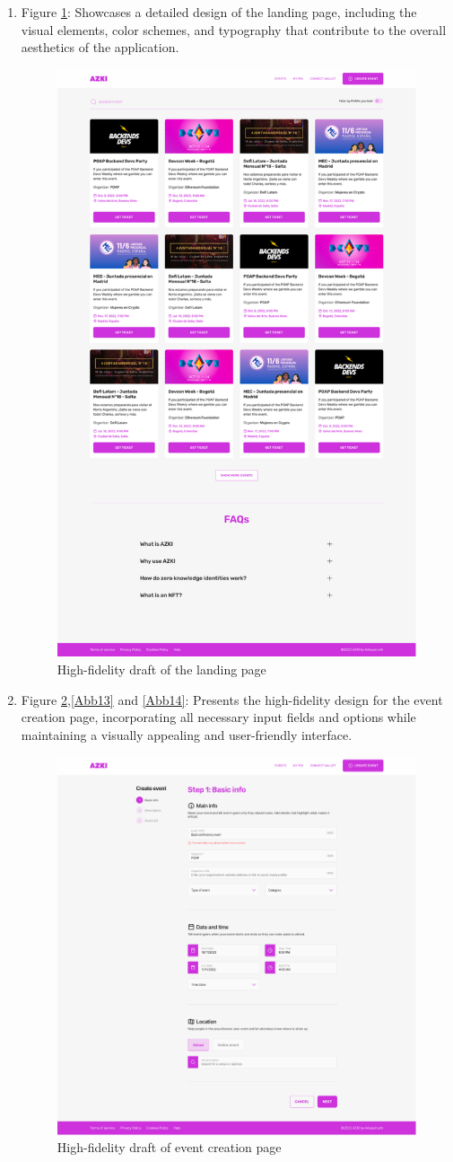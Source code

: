 \begin{enumerate}
\item Figure \ref{Abb11}: Showcases a detailed design of the landing page, including the visual elements, color schemes, and typography that contribute to the overall aesthetics of the application. \
\begin{figure}[H]
\centering
\includegraphics[width=0.5\linewidth]{PICs/HiFiLanding.png}
\caption{High-fidelity draft of the landing page}\label{Abb11}
\end{figure}

\item Figure \ref{Abb12},\ref{Abb13} and \ref{Abb14}: Presents the high-fidelity design for the event creation page, incorporating all necessary input fields and options while maintaining a visually appealing and user-friendly interface.\\
\begin{figure}[H]
\centering
\includegraphics[width=0.5\linewidth]{PICs/HiFiEventCreation.png}
\caption{High-fidelity draft of event creation page}\label{Abb12}
\end{figure}


\end{enumerate}
